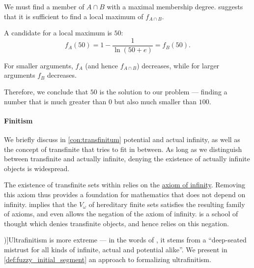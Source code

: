 \begin{example}
  We must find a member of \( A \cap B \) with a maximal membership degree.  suggests that it is sufficient to find a local maximum of \( f_{A \cap B} \).

  A candidate for a local maximum is \( 50 \):
  \begin{equation*}
    f_A(50) = 1 - \frac 1 {\ln(50 + e)} = f_B(50).
  \end{equation*}

  For smaller arguments, \( f_A \) (and hence \( f_{A \cap B} \)) decreases, while for larger arguments \( f_B \) decreases.

  Therefore, we conclude that \( 50 \) is the solution to our problem --- finding a number that is much greater than \( 0 \) but also much smaller than \( 100 \).
\end{example}

\paragraph{Finitism}

\begin{concept}\label{con:finitism}
  We briefly discuss in \cref{con:transfinitum} potential and actual infinity, as well as the concept of transfinite that tries to fit in between. As long as we distinguish between transfinite and actually infinite, denying the existence of actually infinite objects is widespread.

  The existence of transfinite sets within \hyperref[def:zfc]{} relies on the \hyperref[def:zfc/infinity]{axiom of infinity}. Removing this axiom thus provides a foundation for mathematics that does not depend on infinity.  implies that the \hyperref[def:universe_of_hereditary_finite_sets]{\( V_\omega \)} of hereditary finite sets satisfies the resulting family of axioms, and even allows the negation of the axiom of infinity.  is a school of thought which denies transfinite objects, and hence relies on this negation.

  \term[en=ultrafinitism (\cite[2]{MannucciCherubin2006UltrafinitismI})]{Ultrafinitism} is more extreme --- in the words of , it stems from a \enquote{deep-seated mistrust for all kinds of infinite, actual and potential alike}. We present in \cref{def:fuzzy_initial_segment} an approach to formalizing ultrafinitism.
\end{concept}

